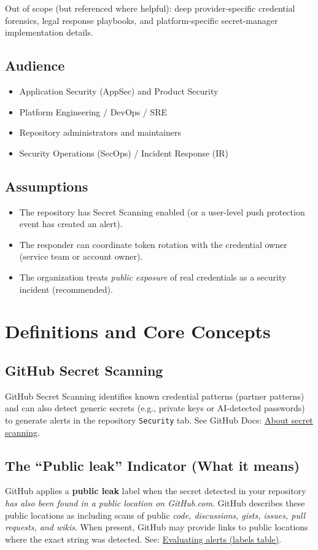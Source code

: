 \documentclass[11pt]{article}
\newcommand{\term}[1]{\textbf{#1}}
\newcommand{\code}[1]{\texttt{#1}}
\begin{document}
Out of scope (but referenced where helpful): deep provider-specific credential forensics, legal response playbooks, and platform-specific secret-manager implementation details.

\subsection{Audience}
\begin{itemize}
  \item Application Security (AppSec) and Product Security
  \item Platform Engineering / DevOps / SRE
  \item Repository administrators and maintainers
  \item Security Operations (SecOps) / Incident Response (IR)
\end{itemize}

\subsection{Assumptions}
\begin{itemize}
  \item The repository has Secret Scanning enabled (or a user-level push protection event has created an alert).
  \item The responder can coordinate token rotation with the credential owner (service team or account owner).
  \item The organization treats \emph{public exposure} of real credentials as a security incident (recommended).
\end{itemize}

\section{Definitions and Core Concepts}
\subsection{GitHub Secret Scanning}
GitHub Secret Scanning identifies known credential patterns (partner patterns) and can also detect generic secrets (e.g., private keys or AI-detected passwords) to generate alerts in the repository \code{Security} tab. See GitHub Docs: \href{https://docs.github.com/code-security/secret-scanning/about-secret-scanning}{About secret scanning}.

\subsection{The ``Public leak'' Indicator (What it means)}
GitHub applies a \term{public leak} label when the secret detected in your repository \emph{has also been found in a public location on GitHub.com}. GitHub describes these public locations as including scans of public \emph{code, discussions, gists, issues, pull requests, and wikis}. When present, GitHub may provide links to public locations where the exact string was detected. See: \href{https://docs.github.com/en/enterprise-cloud@latest/code-security/tutorials/remediate-leaked-secrets/evaluating-alerts}{Evaluating alerts (labels table)}.
\end{document}
